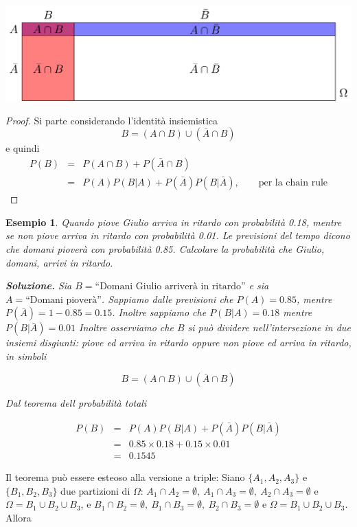\documentclass[
  11pt,
]{book}
\theoremstyle{mytheoremstyle}
\theoremstyle{mydefstyle}
\newtheorem{example}{{Esempio}}[section]
\begin{document}
\begin{center}\includegraphics[width=41.67in,height=0.2\textheight,]{img/2x2} \end{center}

\begin{proof}
Si parte considerando l'identità insiemistica
\[
B = (A\cap B) \cup (\bar A \cap B)
\]
e quindi
\begin{eqnarray*}
  P(B)&=&P(A\cap B)+P(\bar A\cap B)\\
  &=& P(A)P(B|A)+P(\bar A)P(B|\bar A), \qquad \text{per la chain rule}
\end{eqnarray*}
\end{proof}

\begin{example}
Quando piove Giulio arriva in ritardo con probabilità 0.18, mentre se
non piove arriva in ritardo con probabilità 0.01. Le previsioni del
tempo dicono che domani pioverà con probabilità 0.85. Calcolare la
probabilità che Giulio, domani, arrivi in ritardo.

\textbf{Soluzione.} Sia \(B=\text{“Domani Giulio arriverà in ritardo''}\) e sia
\(A=\text{“Domani pioverà''}\). Sappiamo dalle previsioni che \(P(A)=0.85\),
mentre \(P(\bar A)=1-0.85=0.15\). Inoltre sappiamo che \(P(B|A)=0.18\)
mentre \(P(B|\bar A)=0.01\) Inoltre osserviamo che \(B\) si può dividere
nell'intersezione in due insiemi disgiunti: piove \emph{ed} arriva in ritardo
\emph{oppure} non piove \emph{ed} arriva in ritardo, in simboli

\[
B = (A\cap B) \cup (\bar A \cap B)
\]

Dal teorema dell probabilità totali

\begin{eqnarray*}
P(B)&=&P(A)P(B|A)+P(\bar A)P(B|\bar A)\\
&=& 0.85\times 0.18 + 0.15\times 0.01\\
&=& 0.1545
\end{eqnarray*}
\end{example}

Il teorema può essere esteoso alla versione a triple: Siano \(\{A_1,A_2,A_3\}\) e \(\{B_1,B_2,B_3\}\) due partizioni di \(\Omega\):
\(A_1\cap A_2=\emptyset, ~A_1\cap A_3=\emptyset,~A_2\cap A_3=\emptyset\) e
\(\Omega=B_1\cup B_2\cup B_3\), e \(B_1\cap B_2=\emptyset, ~B_1\cap B_3=\emptyset,~B_2\cap B_3=\emptyset\) e \(\Omega=B_1\cup B_2\cup B_3\). Allora
\end{document}
